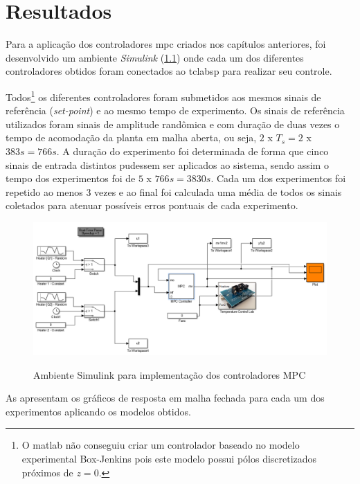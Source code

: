\chapter{Resultados}
\label{ch:resultados}

Para a aplicação dos controladores \acrshort{mpc} criados nos capítulos anteriores, foi desenvolvido um
ambiente \textit{Simulink} (\cref{fig:simulinkusingmpc}) onde cada um dos diferentes controladores obtidos
foram conectados ao \acrshort{tclabsp} para realizar seu controle.

Todos\footnote{
    O \acrshort{matlab} não conseguiu criar um controlador baseado no modelo experimental Box-Jenkins
    pois este modelo possui pólos discretizados próximos de $z=0$.
}  os diferentes controladores foram submetidos aos mesmos sinais de referência (\textit{set-point})
e ao mesmo tempo de experimento. Os sinais de referência utilizados foram sinais de amplitude randômica
e com duração de duas vezes o tempo de acomodação da planta em malha aberta, ou seja, $2$ x $T_s = 2$ x $383s = 766s$.
A duração do experimento foi determinada de forma que cinco sinais de entrada distintos pudessem ser
aplicados ao sistema, sendo assim o tempo dos experimentos foi de $5$ x $766s = 3830s$.
Cada um dos experimentos foi repetido ao menos 3 vezes e ao final foi calculada uma média de todos os 
sinais coletados para atenuar possíveis erros pontuais de cada experimento.

\begin{figure}[!h]
	\caption{Ambiente Simulink para implementação dos controladores MPC}
	\begin{center}
		\includegraphics[width=1.00\textwidth]{./5_images/SimulinkUsingMPC.png} 
		\label{fig:simulinkusingmpc}
	\end{center}
	\centering
\end{figure}

As  apresentam os gráficos de resposta em malha fechada
para cada um dos experimentos aplicando os modelos obtidos.

